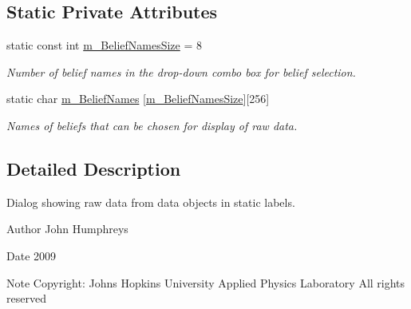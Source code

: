 \subsection*{Static Private Attributes}
\begin{DoxyCompactItemize}
\item 
\hypertarget{class_raw_data_dialog_a5c6e246e8b5fa5cbb99fa4ea50b59604}{
static const int \hyperlink{class_raw_data_dialog_a5c6e246e8b5fa5cbb99fa4ea50b59604}{m\_\-BeliefNamesSize} = 8}
\label{class_raw_data_dialog_a5c6e246e8b5fa5cbb99fa4ea50b59604}

\begin{DoxyCompactList}\small\item\em Number of belief names in the drop-\/down combo box for belief selection. \end{DoxyCompactList}\item 
static char \hyperlink{class_raw_data_dialog_aadc315770f6c61cc4d00058f876dcd6c}{m\_\-BeliefNames} \mbox{[}\hyperlink{class_raw_data_dialog_a5c6e246e8b5fa5cbb99fa4ea50b59604}{m\_\-BeliefNamesSize}\mbox{]}\mbox{[}256\mbox{]}
\begin{DoxyCompactList}\small\item\em Names of beliefs that can be chosen for display of raw data. \end{DoxyCompactList}\end{DoxyCompactItemize}


\subsection{Detailed Description}
Dialog showing raw data from data objects in static labels. 

\begin{DoxyAuthor}{Author}
John Humphreys 
\end{DoxyAuthor}
\begin{DoxyDate}{Date}
2009 
\end{DoxyDate}
\begin{DoxyNote}{Note}
Copyright: Johns Hopkins University Applied Physics Laboratory All rights reserved 
\end{DoxyNote}


